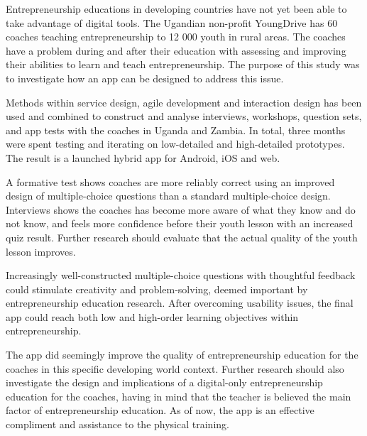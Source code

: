 
Entrepreneurship educations in developing countries have not yet been able to take advantage of digital tools. The Ugandian non-profit YoungDrive has 60 coaches teaching entrepreneurship to 12 000 youth in rural areas. The coaches have a problem during and after their education with assessing and improving their abilities to learn and teach entrepreneurship. The purpose of this study was to investigate how an app can be designed to address this issue.

Methods within service design, agile development and interaction design has been used and combined to construct and analyse interviews, workshops, question sets, and app tests with the coaches in Uganda and Zambia. In total, three months were spent testing and iterating on low-detailed and high-detailed prototypes. The result is a launched hybrid app for Android, iOS and web.

A formative test shows coaches are more reliably correct using an improved design of multiple-choice questions than a standard multiple-choice design. Interviews shows the coaches has become more aware of what they know and do not know, and feels more confidence before their youth lesson with an increased quiz result. Further research should evaluate that the actual quality of the youth lesson improves.

Increasingly well-constructed multiple-choice questions with thoughtful feedback could stimulate creativity and problem-solving, deemed important by entrepreneurship education research. After overcoming usability issues, the final app could reach both low and high-order learning objectives within entrepreneurship.

The app did seemingly improve the quality of entrepreneurship education for the coaches in this specific developing world context. Further research should also investigate the design and implications of a digital-only entrepreneurship education for the coaches, having in mind that the teacher is believed the main factor of entrepreneurship education. As of now, the app is an effective compliment and assistance to the physical training.
